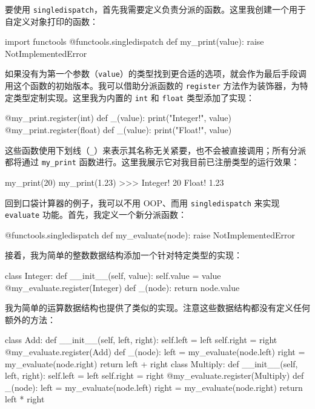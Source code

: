 要使用 \texttt{singledispatch}，首先我需要定义负责分派的函数。这里我创建一个用于自定义对象打印的函数：

\begin{codebox}[python]
import functools
@functools.singledispatch
def my_print(value):
    raise NotImplementedError
\end{codebox}

如果没有为第一个参数（\texttt{value}）的类型找到更合适的选项，就会作为最后手段调用这个函数的初始版本。我可以借助分派函数的 \texttt{register} 方法作为装饰器，为特定类型定制实现。这里我为内置的 \texttt{int} 和 \texttt{float} 类型添加了实现：

\begin{codebox}[python]
@my_print.register(int)
def _(value):
    print("Integer!", value)
@my_print.register(float)
def _(value):
    print("Float!", value)
\end{codebox}

这些函数使用下划线（\texttt{\_}）来表示其名称无关紧要，也不会被直接调用；所有分派都将通过 \texttt{my\_print} 函数进行。这里我展示它对我目前已注册类型的运行效果：

\begin{codebox}[python]
my_print(20)
my_print(1.23)
>>>
Integer! 20
Float! 1.23
\end{codebox}

回到口袋计算器的例子，我可以不用 OOP、而用 \texttt{singledispatch} 来实现 \texttt{evaluate} 功能。首先，我定义一个新分派函数：

\begin{codebox}[python]
@functools.singledispatch
def my_evaluate(node):
    raise NotImplementedError
\end{codebox}

接着，我为简单的整数数据结构添加一个针对特定类型的实现：

\begin{codebox}[python]
class Integer:
    def __init__(self, value):
        self.value = value
@my_evaluate.register(Integer)
def _(node):
    return node.value
\end{codebox}

我为简单的运算数据结构也提供了类似的实现。注意这些数据结构都没有定义任何额外的方法：

\begin{codebox}[python]
class Add:
    def __init__(self, left, right):
        self.left = left
        self.right = right
@my_evaluate.register(Add)
def _(node):
    left = my_evaluate(node.left)
    right = my_evaluate(node.right)
    return left + right
class Multiply:
    def __init__(self, left, right):
        self.left = left
        self.right = right
@my_evaluate.register(Multiply)
def _(node):
    left = my_evaluate(node.left)
    right = my_evaluate(node.right)
    return left * right
\end{codebox}

